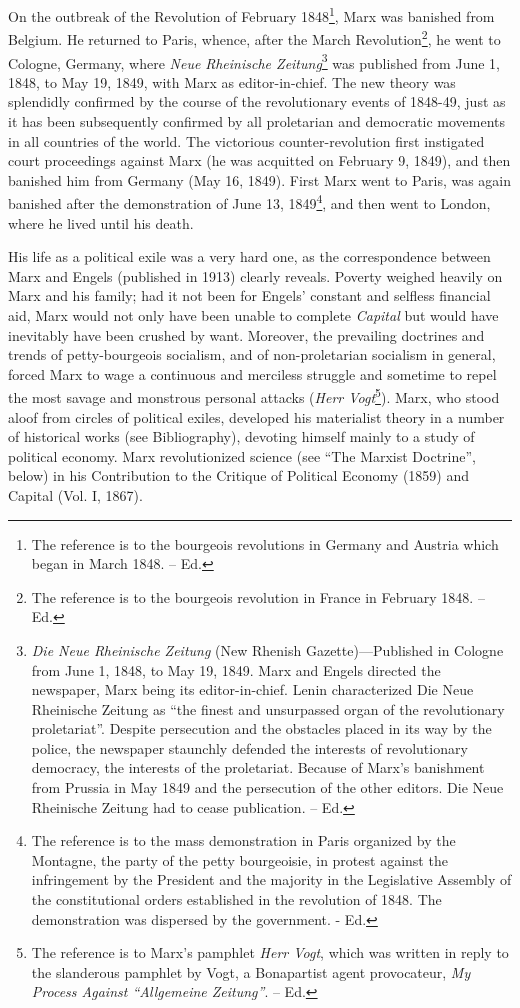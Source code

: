 \documentclass[a4paper,12pt]{book}
\begin{document}
On the outbreak of the Revolution of February 1848\footnote{The reference is to the bourgeois revolutions in Germany and Austria which began in March 1848. -- Ed.}, Marx was banished from Belgium. He returned to Paris, whence, after the March Revolution\footnote{ The reference is to the bourgeois revolution in France in February 1848. -- Ed.}, he went to Cologne, Germany, where \emph{Neue Rheinische Zeitung}\footnote{\emph{Die Neue Rheinische Zeitung} (New Rhenish Gazette)—Published in Cologne from June 1, 1848, to May 19, 1849. Marx and Engels directed the newspaper, Marx being its editor-in-chief. Lenin characterized Die Neue Rheinische Zeitung as “the finest and unsurpassed organ of the revolutionary proletariat”. Despite persecution and the obstacles placed in its way by the police, the newspaper staunchly defended the interests of revolutionary democracy, the interests of the proletariat. Because of Marx’s banishment from Prussia in May 1849 and the persecution of the other editors. Die Neue Rheinische Zeitung had to cease publication. -- Ed.} was published from June 1, 1848, to May 19, 1849, with Marx as editor-in-chief. The new theory was splendidly confirmed by the course of the revolutionary events of 1848-49, just as it has been subsequently confirmed by all proletarian and democratic movements in all countries of the world. The victorious counter-revolution first instigated court proceedings against Marx (he was acquitted on February 9, 1849), and then banished him from Germany (May 16, 1849). First Marx went to Paris, was again banished after the demonstration of June 13, 1849\footnote{The reference is to the mass demonstration in Paris organized by the Montagne, the party of the petty bourgeoisie, in protest against the infringement by the President and the majority in the Legislative Assembly of the constitutional orders established in the revolution of 1848. The demonstration was dispersed by the government. - Ed.}, and then went to London, where he lived until his death.

His life as a political exile was a very hard one, as the correspondence between Marx and Engels (published in 1913) clearly reveals. Poverty weighed heavily on Marx and his family; had it not been for Engels’ constant and selfless financial aid, Marx would not only have been unable to complete \emph{Capital} but would have inevitably have been crushed by want. Moreover, the prevailing doctrines and trends of petty-bourgeois socialism, and of non-proletarian socialism in general, forced Marx to wage a continuous and merciless struggle and sometime to repel the most savage and monstrous personal attacks (\emph{Herr Vogt}\footnote{The reference is to Marx’s pamphlet \emph{Herr Vogt}, which was written in reply to the slanderous pamphlet by Vogt, a Bonapartist agent provocateur, \emph{My Process Against “Allgemeine Zeitung”}. -- Ed.}). Marx, who stood aloof from circles of political exiles, developed his materialist theory in a number of historical works (see Bibliography), devoting himself mainly to a study of political economy. Marx revolutionized science (see “The Marxist Doctrine”, below) in his Contribution to the Critique of Political Economy (1859) and Capital (Vol. I, 1867).
\end{document}
